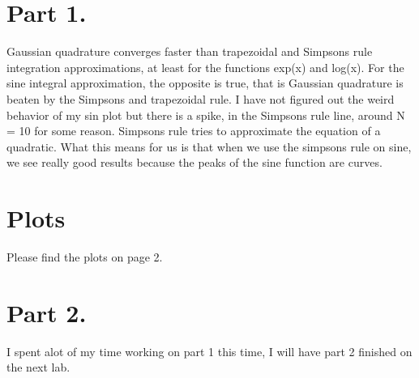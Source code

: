 \documentclass[12pt]{article}
\begin{document}
\maketitle

\section{Part 1. }
Gaussian quadrature converges faster than trapezoidal and Simpsons rule integration approximations, at least for the functions exp(x) and log(x). For the sine integral approximation, the opposite is true, that is Gaussian quadrature is beaten by the Simpsons and trapezoidal rule. I have not figured out the weird behavior of my sin plot but there is a spike, in the Simpsons rule line, around N = 10 for some reason. Simpsons rule tries to approximate the equation of a quadratic. What this means for us is that when we use the simpsons rule on sine, we see really good results because the peaks of the sine function are curves. 
\section{Plots}\label{plots}
Please find the plots on page 2. \\

\section{Part 2. }
I spent alot of my time working on part 1 this time, I will have part 2 finished on the next lab.
\end{document}
